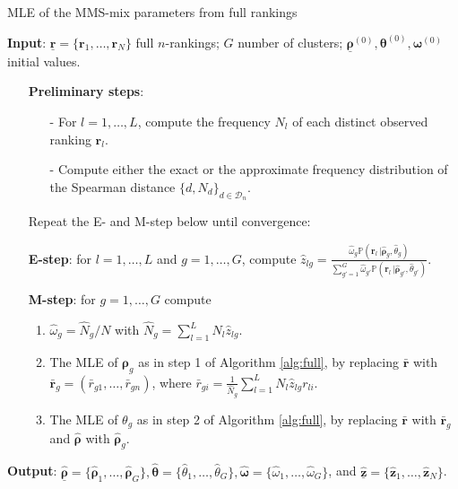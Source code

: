 \begin{algorithm}[h]\small
\caption{MLE of the MMS-mix parameters from full rankings}
\label{alg:full_mixture}
\hspace*{\algorithmicindent} \textbf{Input}: $\underline{\bm{r}}=\{\bm{r}_1,\dots,\bm{r}_N\}$ full $n$-rankings; $G$ number of clusters; $\underline{\bm{\rho}}^{(0)}, \bm{\theta}^{(0)}, \bm{\omega}^{(0)}$ initial values.

\begin{enumerate}
\item[] \textbf{Preliminary steps}:
\begin{itemize}
    \item[-] For $l=1,\dots,L$, compute the frequency $N_l$ of each distinct observed ranking $\bm{r}_l$.
    \item[-] Compute either the exact or the
approximate frequency distribution of the Spearman distance $\{d,N_d\}_{d\in\mathcal{D}_n}$.
    \end{itemize}

     \item[] Repeat the E- and M-step below until convergence:
    \item[] \textbf{E-step}: for $l=1,\dots,L$ and $g=1,\dots,G$, compute
$ \hat z_{lg} = \frac{\hat\omega_g\mathbb{P}(\bm{r}_l\,|\hat{\bm{\rho}}_g,\hat\theta_g)}{\sum_{g\prime=1}^G\hat\omega_{g\prime}\mathbb{P}(\bm{r}_l\,|\hat{\bm{\rho}}_{g\prime},\hat\theta_{g\prime})}$.
    \item[]\textbf{M-step}: for $g=1,\dots,G$ compute
    \begin{enumerate}
        \item $\hat \omega_g =\hat{N}_g/N$ with $\hat{N}_g =\sum_{l=1}^L N_l \hat z_{lg}$.
        \item The MLE of $\bm\rho_g$ as in step 1 of Algorithm \ref{alg:full},  by replacing $\bar{\bm r}$ with\\
        $\bar{\bm r}_g = (\bar r_{g1},\dots, \bar r_{gn})$, where $\bar r_{gi} = \frac{1}{\hat N_g}\sum_{l=1}^L N_l\hat z_{lg}r_{li}$.
        \item The MLE of $\theta_g$ as in step 2 of Algorithm \ref{alg:full}, by replacing $\bar{\bm r}$ with $\bar{\bm r}_g$ and $\hat{\bm\rho}$ with $\hat{\bm\rho}_g$.
    \end{enumerate}
\end{enumerate}
    \hspace*{\algorithmicindent} \textbf{Output}: $\underline{\hat{\bm{\rho}}}=\{\hat{\bm{\rho}}_1,\dots,\hat{\bm{\rho}}_G\},{\hat{\bm\theta}}=\{\hat{\theta}_1,\dots,\hat{\theta}_G\},{\hat{\bm\omega}}=\{\hat\omega_1,\dots,\hat\omega_G\}$, and $\underline{\hat{\bm z}}=\{\bm \hat z_1,\dots,\bm \hat z_N\}$.
\end{algorithm}



